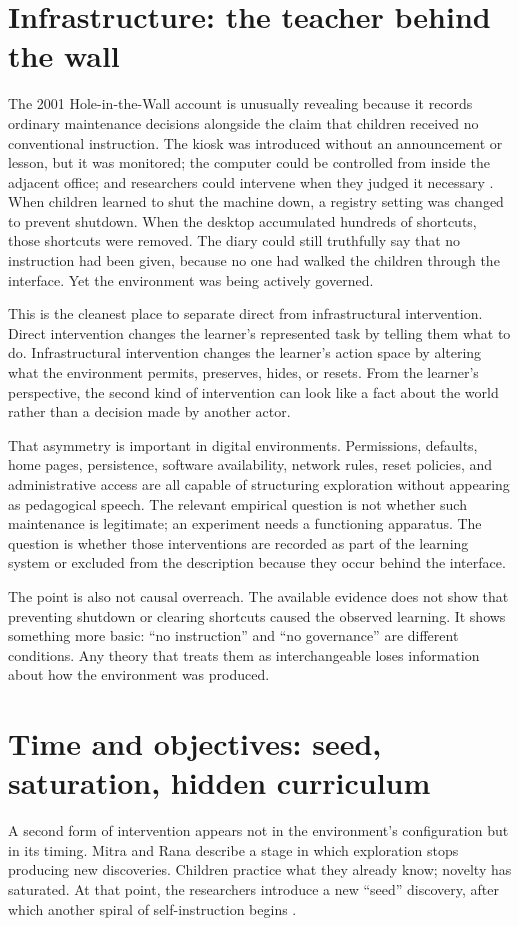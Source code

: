 \documentclass[11pt]{article}
\begin{document}
\section{Infrastructure: the teacher behind the wall}
The 2001 Hole-in-the-Wall account is unusually revealing because it records ordinary maintenance decisions alongside the claim that children received no conventional instruction. The kiosk was introduced without an announcement or lesson, but it was monitored; the computer could be controlled from inside the adjacent office; and researchers could intervene when they judged it necessary \citep{mitra2001children}. When children learned to shut the machine down, a registry setting was changed to prevent shutdown. When the desktop accumulated hundreds of shortcuts, those shortcuts were removed. The diary could still truthfully say that no instruction had been given, because no one had walked the children through the interface. Yet the environment was being actively governed.

This is the cleanest place to separate direct from infrastructural intervention. Direct intervention changes the learner's represented task by telling them what to do. Infrastructural intervention changes the learner's action space by altering what the environment permits, preserves, hides, or resets. From the learner's perspective, the second kind of intervention can look like a fact about the world rather than a decision made by another actor.

That asymmetry is important in digital environments. Permissions, defaults, home pages, persistence, software availability, network rules, reset policies, and administrative access are all capable of structuring exploration without appearing as pedagogical speech. The relevant empirical question is not whether such maintenance is legitimate; an experiment needs a functioning apparatus. The question is whether those interventions are recorded as part of the learning system or excluded from the description because they occur behind the interface.

The point is also not causal overreach. The available evidence does not show that preventing shutdown or clearing shortcuts caused the observed learning. It shows something more basic: ``no instruction'' and ``no governance'' are different conditions. Any theory that treats them as interchangeable loses information about how the environment was produced.

\section{Time and objectives: seed, saturation, hidden curriculum}
A second form of intervention appears not in the environment's configuration but in its timing. Mitra and Rana describe a stage in which exploration stops producing new discoveries. Children practice what they already know; novelty has saturated. At that point, the researchers introduce a new ``seed'' discovery, after which another spiral of self-instruction begins \citep{mitra2001children}.
\end{document}
